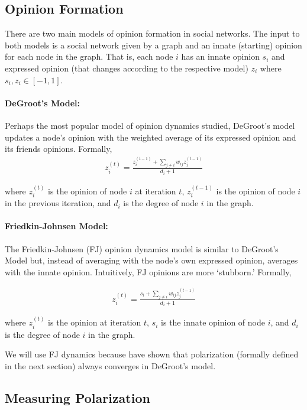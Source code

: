 \subsection{Opinion Formation}
There are two main models of opinion formation in social
networks.
The input to both models is a social network
given by a graph and an innate (starting) opinion for each
node in the graph.
That is, each node $i$ has an innate opinion
$s_i$ and expressed opinion (that changes according
to the respective model) $z_i$
where $s_i, z_i \in [-1, 1]$.

\paragraph{DeGroot's Model:} Perhaps the most popular model of opinion dynamics studied, DeGroot's model updates a node's opinion with the weighted average of its expressed opinion and its friends opinions. Formally,
\begin{align}
    z_i^{(t)} = \frac{z_i^{(t-1)} + \sum_{j \neq i} w_{ij}z_j^{(t-1)}}{d_i + 1}
    \nonumber
\end{align}

where $z_i^{(t)}$ is the opinion of node $i$ at iteration $t$,
$z_i^{(t-1)}$ is the opinion of node $i$ in the previous iteration,
and $d_i$ is the degree of node $i$ in the graph.
\medskip \medskip

\paragraph{Friedkin-Johnsen Model:} The Friedkin-Johnsen (FJ) opinion dynamics model is similar to DeGroot's Model but, instead
of averaging with the node's own expressed opinion, averages
with the innate opinion.
Intuitively, FJ opinions are more `stubborn.'
Formally,

\begin{align}\label{eq:updateruleFJ}
    z_i^{(t)} = \frac{s_i + \sum_{j \neq i}
    w_{ij}z_j^{(t-1)}}{d_i + 1}
\end{align}

where $z_i^{(t)}$ is the opinion at iteration $t$, $s_i$ is the innate opinion of node $i$, and $d_i$ is the degree of node $i$ in the graph.

We will use FJ dynamics because
\cite{Dandekarpnas} have shown that polarization
(formally defined in the next section)
always converges in DeGroot's model.

\subsection{Measuring Polarization}

